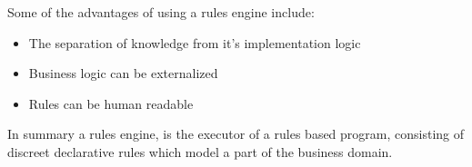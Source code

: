 Some of the advantages of using a rules engine include:
\begin{itemize}
    \item The separation of knowledge from it's implementation logic
    \item Business logic can be externalized
    \item Rules can be human readable
\end{itemize}

In summary a rules engine, is the executor of a rules based program, consisting of discreet declarative rules which model a part of the business domain.






